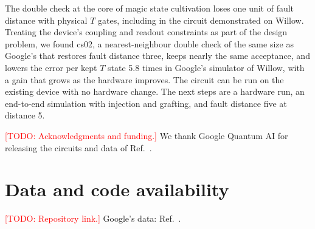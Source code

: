 \documentclass[aps,pra,reprint,superscriptaddress,longbibliography]{revtex4-2}
\newcommand{\csz}{\textsf{cs02}}
\newcommand{\todo}[1]{\textcolor{red}{[TODO: #1]}}
\begin{document}
The double check at the core of magic state cultivation loses one unit of fault distance with physical $T$ gates, including in the circuit demonstrated on Willow.
Treating the device's coupling and readout constraints as part of the design problem, we found \csz, a nearest-neighbour double check of the same size as Google's that restores fault distance three, keeps nearly the same acceptance, and lowers the error per kept $T$ state 5.8 times in Google's simulator of Willow, with a gain that grows as the hardware improves.
The circuit can be run on the existing device with no hardware change.
The next steps are a hardware run, an end-to-end simulation with injection and grafting, and fault distance five at distance 5.

\begin{acknowledgments}
\todo{Acknowledgments and funding.} We thank Google Quantum AI for releasing the circuits and data of Ref.~\cite{Rosenfeld2025}.
\end{acknowledgments}

\section*{Data and code availability}
\todo{Repository link.} Google's data: Ref.~\cite{RosenfeldData}.


\end{document}
